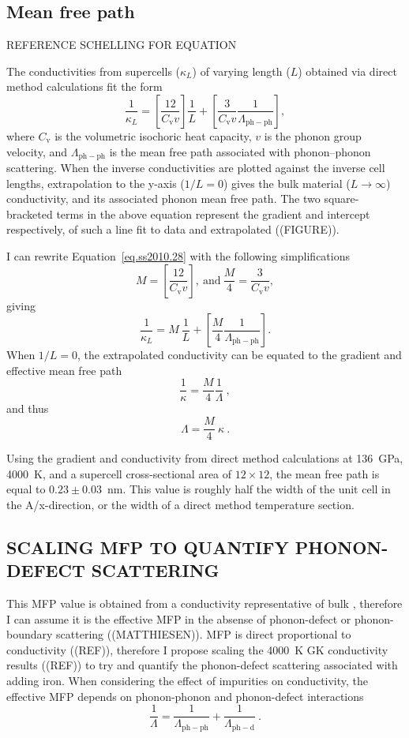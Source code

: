 \subsection{Mean free path}
REFERENCE SCHELLING FOR EQUATION

The conductivities from supercells ($\kappa_{L}$) of varying length ($L$) obtained via direct method calculations fit the form \citep[modified from][]{Stackhouse2010}
%
\begin{equation} 
\frac{1}{\kappa_{L}}=\left [ \frac{12}{C_{\mathrm{v}}v} \right ]\frac{1}{L}+\left [ \frac{3}{C_{\mathrm{v}}v} \frac{1}{\Lambda_{\mathrm{ph-ph}}} \right ],
\label{eq.ss2010.28}
\end{equation}
%
where $C_{\mathrm{v}}$ is the volumetric isochoric heat capacity, $v$ is the phonon group velocity, and $\Lambda_{\mathrm{ph-ph}}$ is the mean free path associated with phonon--phonon scattering. When the inverse conductivities are plotted against the inverse cell lengths, extrapolation to the y-axis ($1/L = 0$) gives the bulk material ($L\rightarrow \infty$) conductivity, and its associated phonon mean free path. The two square-bracketed terms in the above equation represent the gradient and intercept respectively, of such a line fit to data and extrapolated ((FIGURE)). 

I can rewrite Equation~\ref{eq.ss2010.28} with the following simplifications 
%
$$M = \left [ \frac{12}{C_{\mathrm{v}}v} \right ],\ \mathrm{and}\ \frac{M}{4}= \frac{3}{C_{\mathrm{v}}v},$$
%
giving
%
$$ \frac{1}{\kappa_{L}}= M\ \frac{1}{L}+\left [ \frac{M}{4} \frac{1}{\Lambda_{\mathrm{ph-ph}}} \right ]. $$
%
When $1/L = 0$, the extrapolated conductivity can be equated to the gradient and effective mean free path
%
$$ \frac{1}{\kappa}=  \frac{M}{4} \frac{1}{\Lambda}\ ,$$
%
and thus 
%
$$ 
\Lambda = \frac{M}{4}\ \kappa \ .$$

Using the gradient and conductivity from direct method calculations at 136~GPa, 4000~K, and a supercell cross-sectional area of $12\times12$, the mean free path is equal to $0.23\pm0.03$~nm. This value is roughly half the width of the unit cell in the A/x-direction, or the width of a direct method temperature section.



\subsection{SCALING MFP TO QUANTIFY PHONON-DEFECT SCATTERING}
This MFP value is obtained from a conductivity representative of bulk \mgsios \bdg, therefore I can assume it is the effective MFP in the absense of phonon-defect or phonon-boundary scattering ((MATTHIESEN)). MFP is direct proportional to conductivity ((REF)), therefore I propose scaling the 4000~K GK conductivity results ((REF)) to try and quantify the phonon-defect scattering associated with adding iron. When considering the effect of impurities on conductivity, the effective MFP depends on phonon-phonon and phonon-defect interactions
%
$$\frac{1}{\Lambda}=\frac{1}{\Lambda_{\mathrm{ph-ph}}}+\frac{1}{\Lambda_{\mathrm{ph-d}}}\ . $$


